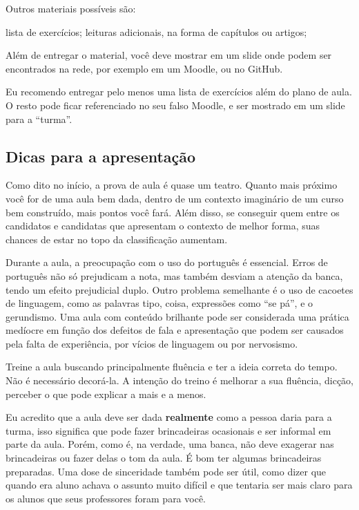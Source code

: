 \documentclass{article}
\begin{document}
Outros materiais possíveis são:
\begin{outline}
\1 lista de exercícios;
\1 leituras adicionais, na forma de capítulos ou artigos;
\end{outline}

Além de entregar o material, você deve mostrar em um slide onde podem ser encontrados na rede, por exemplo em um Moodle, ou no GitHub.

Eu recomendo entregar pelo menos uma lista de exercícios além do plano de aula. O resto pode ficar referenciado no seu falso Moodle, e ser mostrado em um slide para a ``turma''.




\subsection{Dicas para a apresentação}

Como dito no início, a prova de aula é quase um teatro. Quanto mais próximo você for de uma aula bem dada, dentro de um contexto imaginário de um curso bem construído, mais pontos você fará. Além disso, se conseguir quem entre os candidatos e candidatas que apresentam o contexto de melhor forma, suas chances de estar no topo da classificação aumentam.

Durante a aula, a preocupação com o uso do português é essencial. Erros de português não só prejudicam a nota, mas também desviam a atenção da banca, tendo um efeito prejudicial duplo. Outro problema semelhante é o uso de cacoetes de linguagem, como as palavras tipo, coisa, expressões como ``se pá'', e o gerundismo. Uma aula com conteúdo brilhante pode ser considerada  uma prática medíocre em função dos defeitos de fala e apresentação que podem ser causados pela falta de experiência, por vícios de linguagem ou por nervosismo.

Treine a aula buscando principalmente fluência e ter a ideia correta do tempo. Não é necessário decorá-la. A intenção do treino é melhorar a sua fluência, dicção, perceber o que pode explicar a mais e a menos.

Eu acredito que a aula deve ser dada \textbf{realmente} como a pessoa daria para a turma, isso significa que pode fazer brincadeiras ocasionais e ser informal em parte da aula. Porém, como é, na verdade, uma banca, não deve exagerar nas brincadeiras ou fazer delas o tom da aula. É bom ter algumas brincadeiras preparadas. Uma dose de sinceridade também pode ser útil, como dizer que quando era aluno achava o assunto muito difícil e que tentaria ser mais claro para os alunos que seus professores foram para você.
\end{document}

